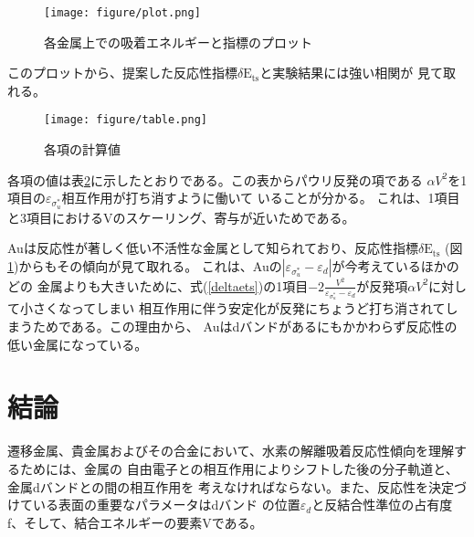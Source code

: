 \documentclass[12pt]{ltjsarticle}
\begin{document}
\begin{figure}[hbtp]
    \begin{center}
     \texttt{[image: figure/plot.png]}
    \end{center}
    \caption{各金属上での吸着エネルギーと指標のプロット}
    \label{fig:plot}
\end{figure}

このプロットから、提案した反応性指標$\delta \text{E}_\text{ts}$と実験結果には強い相関が
見て取れる。

\begin{figure}[hbtp]
    \begin{center}
     \texttt{[image: figure/table.png]}
    \end{center}
    \caption{各項の計算値}
    \label{fig:table}
\end{figure}

各項の値は表\ref{fig:table}に示したとおりである。この表からパウリ反発の項である
$\alpha V^2$を1項目の$\varepsilon _{\sigma_u^*}$相互作用が打ち消すように働いて
いることが分かる。
これは、1項目と3項目におけるVのスケーリング、寄与が近いためである。

Auは反応性が著しく低い不活性な金属として知られており、反応性指標$\delta \text{E}_\text{ts}$
(図\ref{fig:plot})からもその傾向が見て取れる。
これは、Auの$| \varepsilon _{\sigma_u^*} - \varepsilon _d|$が今考えているほかのどの
金属よりも大きいために、式(\ref{deltaets})の1項目$-2 \frac{ V^2 }{\varepsilon _
{\sigma_u^*} - \varepsilon _d}$が反発項$\alpha V^2$に対して小さくなってしまい
相互作用に伴う安定化が反発にちょうど打ち消されてしまうためである。この理由から、
Auはdバンドがあるにもかかわらず反応性の低い金属になっている。

\section{結論}
遷移金属、貴金属およびその合金において、水素の解離吸着反応性傾向を理解するためには、金属の
自由電子との相互作用によりシフトした後の分子軌道と、金属dバンドとの間の相互作用を
考えなければならない。また、反応性を決定づけている表面の重要なパラメータはdバンド
の位置$\varepsilon_d$と反結合性準位の占有度f、そして、結合エネルギーの要素Vである。



\end{document}
